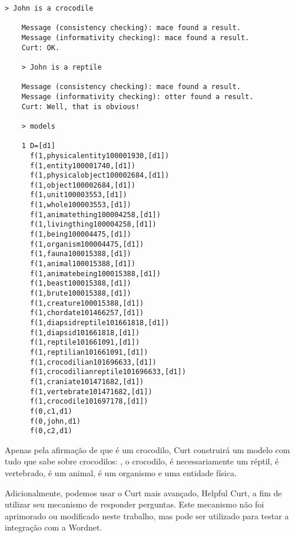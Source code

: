 	\begin{Verbatim}[fontseries=b,gobble=1]
	> John is a crocodile
	
	Message (consistency checking): mace found a result.
	Message (informativity checking): mace found a result.
	Curt: OK.
	
	> John is a reptile
	
	Message (consistency checking): mace found a result.
	Message (informativity checking): otter found a result.
	Curt: Well, that is obvious!
	
	> models
	
	1 D=[d1]
	  f(1,physicalentity100001930,[d1])
	  f(1,entity100001740,[d1])
	  f(1,physicalobject100002684,[d1])
	  f(1,object100002684,[d1])
	  f(1,unit100003553,[d1])
	  f(1,whole100003553,[d1])
	  f(1,animatething100004258,[d1])
	  f(1,livingthing100004258,[d1])
	  f(1,being100004475,[d1])
	  f(1,organism100004475,[d1])
	  f(1,fauna100015388,[d1])
	  f(1,animal100015388,[d1])
	  f(1,animatebeing100015388,[d1])
	  f(1,beast100015388,[d1])
	  f(1,brute100015388,[d1])
	  f(1,creature100015388,[d1])
	  f(1,chordate101466257,[d1])
	  f(1,diapsidreptile101661818,[d1])
	  f(1,diapsid101661818,[d1])
	  f(1,reptile101661091,[d1])
	  f(1,reptilian101661091,[d1])
	  f(1,crocodilian101696633,[d1])
	  f(1,crocodilianreptile101696633,[d1])
	  f(1,craniate101471682,[d1])
	  f(1,vertebrate101471682,[d1])
	  f(1,crocodile101697178,[d1])
	  f(0,c1,d1)
	  f(0,john,d1)
	  f(0,c2,d1)
	\end{Verbatim}
	
	Apenas pela afirmação de que  é um crocodilo, Curt construirá um modelo com tudo que sabe sobre crocodilos: , o crocodilo, é necessariamente um réptil, é vertebrado, é um animal, é um organismo e uma entidade física.
	

	Adicionalmente, podemos usar o Curt mais avançado, Helpful Curt, a fim de utilizar seu mecanismo de responder perguntas. Este mecanismo não foi aprimorado ou modificado neste trabalho, mas pode ser utilizado para testar a integração com a Wordnet.
	
